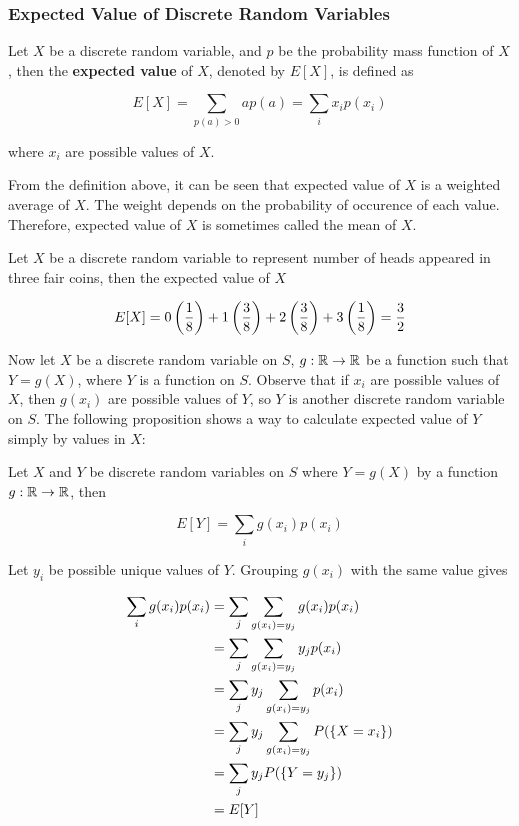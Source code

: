 \documentclass[a4paper,12pt]{article}
\begin{document}
\subsubsection{Expected Value of Discrete Random Variables}
\begin{dft}
  Let $X$ be a discrete random variable, and $p$ be the probability mass function of $X$, then the \textbf{expected value} of $X$, denoted by $E[X]$, is defined as

  $$E[X]=\sum_{p(a)>0}ap(a)=\sum_{i}x_{i}p(x_{i})$$\s

  where $x_{i}$ are possible values of $X$.
\end{dft}\n

From the definition above, it can be seen that expected value of $X$ is a weighted average of $X$. The weight depends on the probability of occurence of each value. Therefore, expected value of $X$ is sometimes called the mean of $X$.\n

\begin{exm}
  Let $X$ be a discrete random variable to represent number of heads appeared in three fair coins, then the expected value of $X$

  $$E[X]=0\left( \frac{1}{8}\right)+1\left( \frac{3}{8}\right)+2\left( \frac{3}{8}\right)+3\left( \frac{1}{8}\right)=\frac{3}{2}$$
\end{exm}\n

Now let $X$ be a discrete random variable on $S$, $g:\mathbb{R}\to\mathbb{R}$ be a function such that $Y=g(X)$, where $Y$ is a function on $S$. Observe that if $x_{i}$ are possible values of $X$, then $g(x_{i})$ are possible values of $Y$, so $Y$ is another discrete random variable on $S$. The following proposition shows a way to calculate expected value of $Y$ simply by values in $X$:\n

\begin{pst}
  Let $X$ and $Y$ be discrete random variables on $S$ where $Y=g(X)$ by a function $g:\mathbb{R}\to\mathbb{R}$, then

  $$E[Y]=\sum_{i}g(x_{i})p(x_{i})$$\s

  \prf Let $y_{i}$ be possible unique values of $Y$. Grouping $g(x_{i})$ with the same value gives
  
  $$\begin{aligned}[t]
    \sum_{i}g(x_{i})p(x_{i})&=\sum_{j}\sum_{g(x_{i})=y_{j}}g(x_{i})p(x_{i})\\
    &=\sum_{j}\sum_{g(x_{i})=y_{j}}y_{j}p(x_{i})\\
    &=\sum_{j}y_{j}\sum_{g(x_{i})=y_{j}}p(x_{i})\\
    &=\sum_{j}y_{j}\sum_{g(x_{i})=y_{j}}P(\left\{ X=x_{i}\right\})\\
    &=\sum_{j}y_{j}P(\left\{ Y=y_{j}\right\})\\
    &=E[Y]
  \end{aligned}$$
\end{pst}\n
\end{document}
